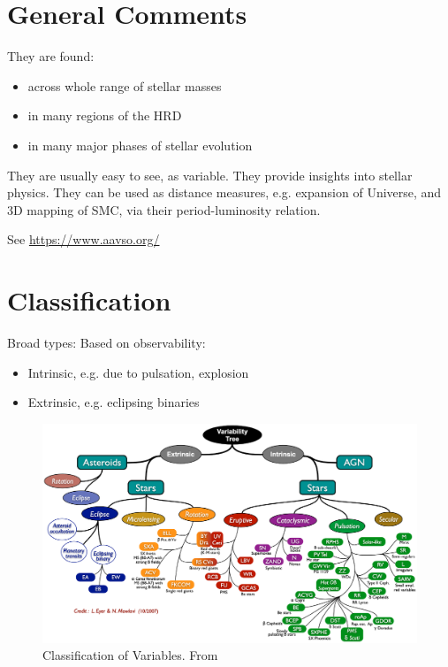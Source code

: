 \documentclass{spy}
\begin{document}
\tableofcontents

\section{General Comments}
They are found:
\begin{itemize}
    \item across whole range of stellar masses
    \item in many regions of the HRD
    \item in many major phases of stellar evolution
\end{itemize}

They are usually easy to see, as variable.
They provide insights into stellar physics.
They can be used as distance measures, e.g. expansion of Universe, and 3D mapping of SMC, via their period-luminosity relation.


See \url{https://www.aavso.org/}

\section{Classification}
Broad types:
Based on observability:
\begin{itemize}
\item Intrinsic, e.g. due to pulsation, explosion
\item Extrinsic, e.g. eclipsing binaries
\end{itemize}

\begin{figure}[ht]
    \centering
    \includegraphics[width=\textwidth]{variable_classes.eps}
    \caption{Classification of Variables. From \citet{eyerVariableStarsObservational2008}}
    \label{variable_classes_diagram}
\end{figure}
\end{document}
